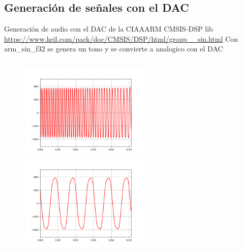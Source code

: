  \subsection{Generación de señales con el DAC}
 \begin{frame}[t]{Generación de audio con el DAC de la CIAA}{ARM CMSIS-DSP lib \tiny
    \href{https://www.keil.com/pack/doc/CMSIS/DSP/html/group\_\_sin.html}{https://www.keil.com/pack/doc/CMSIS/DSP/html/group\_\_sin.html}
    }
    \protoboardicon
    Con arm\_sin\_f32 se genera un tono y se convierte a analogico con el DAC
    \normalsize
       \begin{columns}[t]
          \hspace{2pt}
          \begin{column}{.3\textwidth}
             
          \end{column}
          \hspace{2pt}
          \vrule
          \hspace{2pt}
          \begin{column}{.3\textwidth}
             
          \end{column}
          \hspace{2pt}
          \vrule
          \hspace{2pt}
          \begin{column}{.4\textwidth}
       \center\includegraphics[width=0.5\textwidth]{2_clase/ciaa_audio_gen1.png}
       \center\includegraphics[width=0.5\textwidth]{2_clase/ciaa_audio_gen2.png}
          \end{column}
          \hspace{2pt}
       \end{columns}
   \vfill
 \end{frame}
